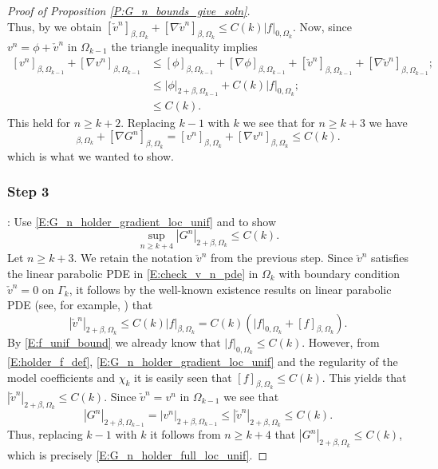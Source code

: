 \documentclass[11pt, letterpaper]{amsart}
\theoremstyle{definition}
\theoremstyle{remark}
\numberwithin{equation}{section}
\begin{document}
\begin{proof}[Proof of Proposition \ref{P:G_n_bounds_give_soln}]
\begin{equation}
\end{equation}
Thus, by \cite[Theorem 4, Ch 7, Section 2]{MR0181836} we obtain $[\check{v}^n]_{\beta,\Omega_k} + [\nabla\check{v}^n]_{\beta,\Omega_k} \leq C(k)|f|_{0,\Omega_k}$. Now, since $v^n = \phi + \check{v}^n$ in $\Omega_{k-1}$  the triangle inequality implies
\begin{equation*}
\begin{split}
[v^n]_{\beta,\Omega_{k-1}} + [\nabla v^n]_{\beta,\Omega_{k-1}} &\leq [\phi]_{\beta,\Omega_{k-1}} + [\nabla\phi]_{\beta,\Omega_{k-1}} + [\check{v}^n]_{\beta,\Omega_{k-1}} + [\nabla\check{v}^n]_{\beta,\Omega_{k-1}};\\
&\leq |\phi|_{2+\beta,\Omega_{k-1}} + C(k)|f|_{0,\Omega_{k}};\\
&\leq C(k).
\end{split}
\end{equation*}
This held for $n\geq k+2$. Replacing $k-1$ with $k$ we see that for $n\geq k+3$ we have
\begin{equation*}
[G^n]_{\beta,\Omega_k} + [\nabla G^n]_{\beta,\Omega_{k}} = [v^n]_{\beta,\Omega_k} + [\nabla v^n]_{\beta,\Omega_{k}} \leq C(k).
\end{equation*}
which is what we wanted to show.

\subsubsection*{Step 3}: Use \eqref{E:G_n_holder_gradient_loc_unif}  and \cite[Theorem (5.14)]{MR1465184} to show
\begin{equation}\label{E:G_n_holder_full_loc_unif}
\sup_{n\geq k+4} |G^n|_{2+\beta,\Omega_k} \leq C(k).
\end{equation}
Let $n\geq k+3$. We retain the notation $\check{v}^n$ from the previous step.  Since $\check{v}^n$ satisfies the linear parabolic PDE in \eqref{E:check_v_n_pde} in $\Omega_k$ with boundary condition $\check{v}^n = 0$ on $\Gamma_k$, it follows by the well-known existence results on linear parabolic PDE (see, for example, \cite[Theorem 5.14]{MR1465184}) that
\begin{equation*}
|\check{v}^n|_{2+\beta,\Omega_k} \leq C(k)|f|_{\beta,\Omega_k} = C(k)\left(|f|_{0,\Omega_k} + [f]_{\beta,\Omega_k}\right).
\end{equation*}
By \eqref{E:f_unif_bound} we already know that $|f|_{0,\Omega_k} \leq C(k)$.  However, from \eqref{E:holder_f_def}, \eqref{E:G_n_holder_gradient_loc_unif} and the regularity of the model coefficients and $\chi_k$ it is easily seen that $[f]_{\beta,\Omega_k} \leq C(k)$.  This yields that $|\check{v}^n|_{2+\beta,\Omega_k} \leq C(k)$. Since $\check{v}^n = v^n$ in $\Omega_{k-1}$ we see that
\begin{equation*}
|G^n|_{2+\beta,\Omega_{k-1}} = |v^n|_{2+\beta,\Omega_{k-1}} \leq |\check{v}^n|_{2+\beta,\Omega_k} \leq C(k).
\end{equation*}
Thus, replacing $k-1$ with $k$ it follows from $n\geq k+4$ that $|G^n|_{2+\beta,\Omega_k} \leq C(k)$, which is precisely \eqref{E:G_n_holder_full_loc_unif}.


\end{proof}
\end{document}
